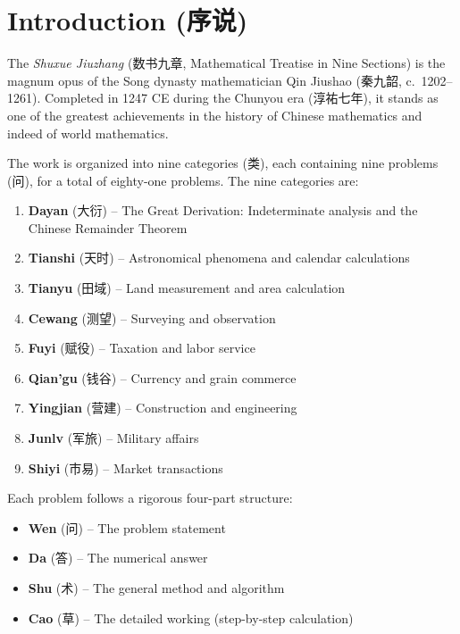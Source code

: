 \documentclass[11pt,a4paper]{article}
\newcommand{\zhtext}[1]{{\chinese #1}}
\begin{document}
\tableofcontents
\newpage

\section{Introduction (\zhtext{序说})}

The \textit{Shuxue Jiuzhang} (\zhtext{数书九章}, Mathematical Treatise in Nine Sections) is the magnum opus of the Song dynasty mathematician Qin Jiushao (\zhtext{秦九韶}, c.~1202--1261). Completed in 1247 CE during the Chunyou era (\zhtext{淳祐七年}), it stands as one of the greatest achievements in the history of Chinese mathematics and indeed of world mathematics.

The work is organized into nine categories (\zhtext{类}), each containing nine problems (\zhtext{问}), for a total of eighty-one problems. The nine categories are:
\begin{enumerate}[label=\arabic*.]
  \item \textbf{Dayan} (\zhtext{大衍}) -- The Great Derivation: Indeterminate analysis and the Chinese Remainder Theorem
  \item \textbf{Tianshi} (\zhtext{天时}) -- Astronomical phenomena and calendar calculations
  \item \textbf{Tianyu} (\zhtext{田域}) -- Land measurement and area calculation
  \item \textbf{Cewang} (\zhtext{测望}) -- Surveying and observation
  \item \textbf{Fuyi} (\zhtext{赋役}) -- Taxation and labor service
  \item \textbf{Qian'gu} (\zhtext{钱谷}) -- Currency and grain commerce
  \item \textbf{Yingjian} (\zhtext{营建}) -- Construction and engineering
  \item \textbf{Junlv} (\zhtext{军旅}) -- Military affairs
  \item \textbf{Shiyi} (\zhtext{市易}) -- Market transactions
\end{enumerate}

Each problem follows a rigorous four-part structure:
\begin{itemize}
  \item \textbf{Wen} (\zhtext{问}) -- The problem statement
  \item \textbf{Da} (\zhtext{答}) -- The numerical answer
  \item \textbf{Shu} (\zhtext{术}) -- The general method and algorithm
  \item \textbf{Cao} (\zhtext{草}) -- The detailed working (step-by-step calculation)
\end{itemize}
\end{document}
